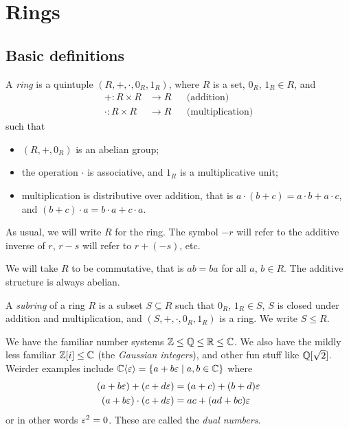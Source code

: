 \documentclass{../template/note}
\begin{document}
    \section{Rings}
    
    \subsection{Basic definitions}

    \begin{definition}[Ring]
        A \emph{ring} is a quintuple $(R, +, \cdot, 0_R, 1_R)$, where $R$ is a set, $0_R$, $1_R \in R$, and
        \begin{align*}
            +: R \times R &\to R && \text{(addition)}\\
            \cdot: R \times R &\to R && \text{(multiplication)}
        \end{align*}
        such that
        \begin{itemize}
            \item $(R, +, 0_R)$ is an abelian group;
            \item the operation $\cdot$ is associative, and $1_R$ is a multiplicative unit;
            \item multiplication is distributive over addition, that is $a \cdot (b + c) = a \cdot b + a \cdot c$, and $(b + c) \cdot a = b \cdot a + c \cdot a$.
        \end{itemize}
    \end{definition}
    
    As usual, we will write $R$ for the ring. The symbol $-r$ will refer to the additive inverse of $r$, $r-s$ will refer to $r+(-s)$, etc.

    \begin{remark*}
        We will take $R$ to be commutative, that is $ab = ba$ for all $a$, $b \in R$. The additive structure is always abelian.
    \end{remark*}
    
    \begin{definition}[Subring]
        A \emph{subring} of a ring $R$ is a subset $S \subseteq R$ such that $0_R$, $1_R \in S$, $S$ is closed under addition and multiplication, and $(S, +, \cdot, 0_R, 1_R)$ is a ring. We write $S \leq R$.
    \end{definition}
    
    \begin{example*}
        We have the familiar number systems $\mathbb Z \leq \mathbb Q \leq \mathbb R \leq \mathbb C$. We also have the mildly less familiar $\mathbb Z[i] \leq \mathbb C$ (the \emph{Gaussian integers}), and other fun stuff like $\mathbb Q[\sqrt 2]$. Weirder examples include $\mathbb C\langle\varepsilon\rangle = \{a + b \varepsilon \mid a, b \in \mathbb C\}$ where
        \begin{align*}
            (a + b\varepsilon) + (c + d\varepsilon) &= (a + c) + (b + d)\varepsilon \\
            (a + b\varepsilon) \cdot (c + d\varepsilon) &= ac + (ad+bc)\varepsilon
        \end{align*}
        or in other words $\varepsilon^2 = 0$. These are called the \emph{dual numbers}.        
    \end{example*}
    
\end{document}
